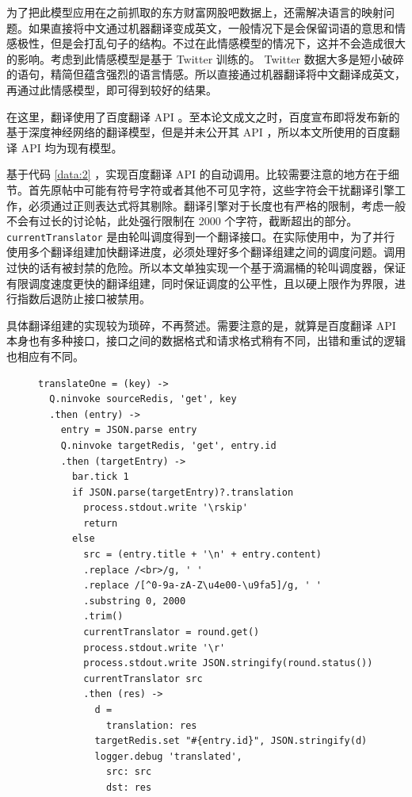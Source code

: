 为了把此模型应用在之前抓取的东方财富网股吧数据上，还需解决语言的映射问题。如果直接将中文通过机器翻译变成英文，一般情况下是会保留词语的意思和情感极性，但是会打乱句子的结构。不过在此情感模型的情况下，这并不会造成很大的影响。考虑到此情感模型是基于 Twitter 训练的。 Twitter 数据大多是短小破碎的语句，精简但蕴含强烈的语言情感。所以直接通过机器翻译将中文翻译成英文，再通过此情感模型，即可得到较好的结果。

在这里，翻译使用了百度翻译 API 。至本论文成文之时，百度宣布即将发布新的基于深度神经网络的翻译模型，但是并未公开其 API ，所以本文所使用的百度翻译 API 均为现有模型。

基于代码 \ref{data:2} ，实现百度翻译 API 的自动调用。比较需要注意的地方在于细节。首先原帖中可能有符号字符或者其他不可见字符，这些字符会干扰翻译引擎工作，必须通过正则表达式将其剔除。翻译引擎对于长度也有严格的限制，考虑一般不会有过长的讨论帖，此处强行限制在 2000 个字符，截断超出的部分。 \texttt{currentTranslator} 是由轮叫调度得到一个翻译接口。在实际使用中，为了并行使用多个翻译组建加快翻译进度，必须处理好多个翻译组建之间的调度问题。调用过快的话有被封禁的危险。所以本文单独实现一个基于滴漏桶的轮叫调度器，保证有限调度速度更快的翻译组建，同时保证调度的公平性，且以硬上限作为界限，进行指数后退防止接口被禁用。

具体翻译组建的实现较为琐碎，不再赘述。需要注意的是，就算是百度翻译 API 本身也有多种接口，接口之间的数据格式和请求格式稍有不同，出错和重试的逻辑也相应有不同。

\begin{figure}
  \begin{minipage}{\textwidth}
    \begin{lstlisting}[caption=百度翻译 API 调用, label=data:2]
translateOne = (key) ->
  Q.ninvoke sourceRedis, 'get', key
  .then (entry) ->
    entry = JSON.parse entry
    Q.ninvoke targetRedis, 'get', entry.id
    .then (targetEntry) ->
      bar.tick 1
      if JSON.parse(targetEntry)?.translation
        process.stdout.write '\rskip'
        return
      else
        src = (entry.title + '\n' + entry.content)
        .replace /<br>/g, ' '
        .replace /[^0-9a-zA-Z\u4e00-\u9fa5]/g, ' '
        .substring 0, 2000
        .trim()
        currentTranslator = round.get()
        process.stdout.write '\r'
        process.stdout.write JSON.stringify(round.status())
        currentTranslator src
        .then (res) ->
          d =
            translation: res
          targetRedis.set "#{entry.id}", JSON.stringify(d)
          logger.debug 'translated',
            src: src
            dst: res
    \end{lstlisting}
  \end{minipage}
\end{figure}

